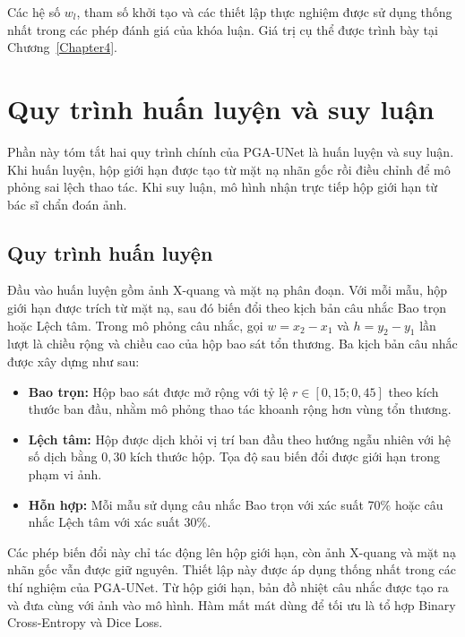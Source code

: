 Các hệ số $w_l$, tham số khởi tạo và các thiết lập thực nghiệm được sử dụng thống nhất trong các phép đánh giá của khóa luận. Giá trị cụ thể được trình bày tại Chương~\ref{Chapter4}.

\section{Quy trình huấn luyện và suy luận}
\label{sec:algorithm_summary}

Phần này tóm tắt hai quy trình chính của PGA-UNet là huấn luyện và suy luận. Khi huấn luyện, hộp giới hạn được tạo từ mặt nạ nhãn gốc rồi điều chỉnh để mô phỏng sai lệch thao tác. Khi suy luận, mô hình nhận trực tiếp hộp giới hạn từ bác sĩ chẩn đoán ảnh.

\subsection{Quy trình huấn luyện}
\label{subsec:training_process}

Đầu vào huấn luyện gồm ảnh X-quang và mặt nạ phân đoạn. Với mỗi mẫu, hộp giới hạn được trích từ mặt nạ, sau đó biến đổi theo kịch bản câu nhắc Bao trọn hoặc Lệch tâm. Trong mô phỏng câu nhắc, gọi $w=x_2-x_1$ và $h=y_2-y_1$ lần lượt là chiều rộng và chiều cao
của hộp bao sát tổn thương. Ba kịch bản câu nhắc được xây dựng như sau:

\begin{itemize}
    \item \textbf{Bao trọn:} Hộp bao sát được mở rộng với tỷ lệ
    $r\in[0{,}15;0{,}45]$ theo kích thước ban đầu, nhằm mô phỏng thao
    tác khoanh rộng hơn vùng tổn thương.

    \item \textbf{Lệch tâm:} Hộp được dịch khỏi vị trí ban đầu theo
    hướng ngẫu nhiên với hệ số dịch bằng $0{,}30$ kích thước hộp. Tọa độ sau biến đổi được giới hạn trong
    phạm vi ảnh.

    \item \textbf{Hỗn hợp:} Mỗi mẫu sử dụng câu nhắc Bao trọn với xác
    suất 70\% hoặc câu nhắc Lệch tâm với xác suất 30\%.
\end{itemize}

Các phép biến đổi này chỉ tác động lên hộp giới hạn, còn ảnh X-quang và mặt nạ nhãn gốc vẫn được giữ nguyên. Thiết lập này được áp dụng thống nhất trong các thí nghiệm của PGA-UNet. Từ hộp giới hạn, bản đồ nhiệt câu nhắc được tạo ra và đưa cùng với ảnh vào mô hình. Hàm mất mát dùng để tối ưu là tổ hợp Binary Cross-Entropy và Dice Loss.

